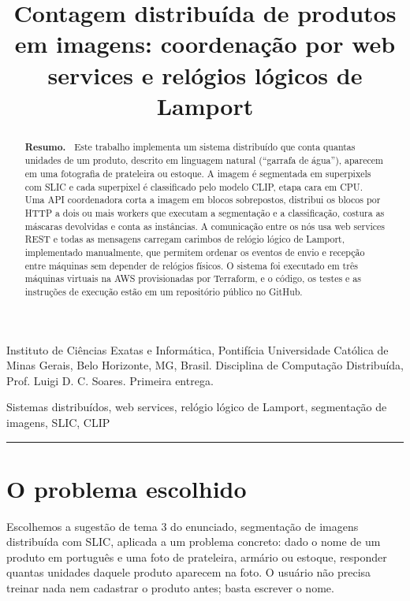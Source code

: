 \documentclass{sbc2023}
\title[Contagem distribuída de produtos em imagens]{Contagem distribuída de produtos em imagens: coordenação por web services e relógios lógicos de Lamport}
\author[Trabalho Prático --- Computação Distribuída]{
\affil{\textbf{André Vieira Penchel}, \textbf{Matheus Campello}, \textbf{João Vitor}, \textbf{Henrique Saldanha}, \textbf{Mateus Martins Parreiras} e \textbf{Arthur Campos}~~[~\textbf{PUC Minas}~]}
}
\renewenvironment{keywords}{\noindent\keywordfont{\textbf{Palavras-chave: }}}{\vskip6pt \rule{\linewidth}{.27pt}\vskip12pt}
\begin{document}
\begin{frontmatter}
\maketitle

\begin{mail}
Instituto de Ciências Exatas e Informática, Pontifícia Universidade Católica de Minas Gerais, Belo Horizonte, MG, Brasil. Disciplina de Computação Distribuída, Prof. Luigi D. C. Soares. Primeira entrega.
\end{mail}

\begin{abstract}
\textbf{Resumo.~}
\noindent Este trabalho implementa um sistema distribuído que conta quantas unidades de um produto, descrito em linguagem natural (``garrafa de água''), aparecem em uma fotografia de prateleira ou estoque. A imagem é segmentada em superpixels com SLIC e cada superpixel é classificado pelo modelo CLIP, etapa cara em CPU. Uma API coordenadora corta a imagem em blocos sobrepostos, distribui os blocos por HTTP a dois ou mais workers que executam a segmentação e a classificação, costura as máscaras devolvidas e conta as instâncias. A comunicação entre os nós usa web services REST e todas as mensagens carregam carimbos de relógio lógico de Lamport, implementado manualmente, que permitem ordenar os eventos de envio e recepção entre máquinas sem depender de relógios físicos. O sistema foi executado em três máquinas virtuais na AWS provisionadas por Terraform, e o código, os testes e as instruções de execução estão em um repositório público no GitHub.
\end{abstract}

\begin{keywords}
Sistemas distribuídos, web services, relógio lógico de Lamport, segmentação de imagens, SLIC, CLIP
\end{keywords}

\end{frontmatter}


\section{O problema escolhido}
\label{sec:problema}

Escolhemos a sugestão de tema 3 do enunciado, segmentação de imagens distribuída com SLIC, aplicada a um problema concreto: dado o nome de um produto em português e uma foto de prateleira, armário ou estoque, responder quantas unidades daquele produto aparecem na foto. O usuário não precisa treinar nada nem cadastrar o produto antes; basta escrever o nome.
\end{document}
